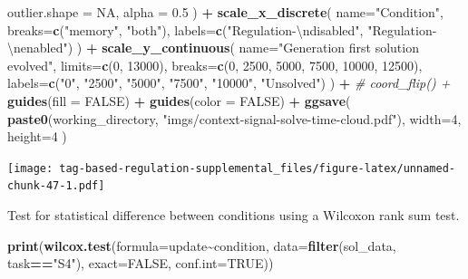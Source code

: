 \documentclass[
]{book}
\newenvironment{Shaded}{\begin{snugshade}}{\end{snugshade}}
\newcommand{\CharTok}[1]{\textcolor[rgb]{0.31,0.60,0.02}{#1}}
\newcommand{\CommentTok}[1]{\textcolor[rgb]{0.56,0.35,0.01}{\textit{#1}}}
\newcommand{\DataTypeTok}[1]{\textcolor[rgb]{0.13,0.29,0.53}{#1}}
\newcommand{\DecValTok}[1]{\textcolor[rgb]{0.00,0.00,0.81}{#1}}
\newcommand{\FloatTok}[1]{\textcolor[rgb]{0.00,0.00,0.81}{#1}}
\newcommand{\KeywordTok}[1]{\textcolor[rgb]{0.13,0.29,0.53}{\textbf{#1}}}
\newcommand{\NormalTok}[1]{#1}
\newcommand{\OperatorTok}[1]{\textcolor[rgb]{0.81,0.36,0.00}{\textbf{#1}}}
\newcommand{\OtherTok}[1]{\textcolor[rgb]{0.56,0.35,0.01}{#1}}
\newcommand{\StringTok}[1]{\textcolor[rgb]{0.31,0.60,0.02}{#1}}
\begin{document}
\begin{Shaded}
\begin{Highlighting}[]
    \DataTypeTok{outlier.shape =} \OtherTok{NA}\NormalTok{,}
    \DataTypeTok{alpha =} \FloatTok{0.5}
\NormalTok{  ) }\OperatorTok{+}
\StringTok{  }\KeywordTok{scale\_x\_discrete}\NormalTok{(}
    \DataTypeTok{name=}\StringTok{"Condition"}\NormalTok{,}
    \DataTypeTok{breaks=}\KeywordTok{c}\NormalTok{(}\StringTok{"memory"}\NormalTok{, }\StringTok{"both"}\NormalTok{),}
    \DataTypeTok{labels=}\KeywordTok{c}\NormalTok{(}\StringTok{"Regulation{-}}\CharTok{\textbackslash{}n}\StringTok{disabled"}\NormalTok{, }\StringTok{"Regulation{-}}\CharTok{\textbackslash{}n}\StringTok{enabled"}\NormalTok{)}
\NormalTok{  ) }\OperatorTok{+}
\StringTok{  }\KeywordTok{scale\_y\_continuous}\NormalTok{(}
    \DataTypeTok{name=}\StringTok{"Generation first solution evolved"}\NormalTok{,}
    \DataTypeTok{limits=}\KeywordTok{c}\NormalTok{(}\DecValTok{0}\NormalTok{, }\DecValTok{13000}\NormalTok{),}
    \DataTypeTok{breaks=}\KeywordTok{c}\NormalTok{(}\DecValTok{0}\NormalTok{, }\DecValTok{2500}\NormalTok{, }\DecValTok{5000}\NormalTok{, }\DecValTok{7500}\NormalTok{, }\DecValTok{10000}\NormalTok{, }\DecValTok{12500}\NormalTok{),}
    \DataTypeTok{labels=}\KeywordTok{c}\NormalTok{(}\StringTok{"0"}\NormalTok{, }\StringTok{"2500"}\NormalTok{, }\StringTok{"5000"}\NormalTok{, }\StringTok{"7500"}\NormalTok{, }\StringTok{"10000"}\NormalTok{, }\StringTok{"Unsolved"}\NormalTok{)}
\NormalTok{  ) }\OperatorTok{+}
\StringTok{  }\CommentTok{\# coord\_flip() +}
\StringTok{  }\KeywordTok{guides}\NormalTok{(}\DataTypeTok{fill =} \OtherTok{FALSE}\NormalTok{) }\OperatorTok{+}
\StringTok{  }\KeywordTok{guides}\NormalTok{(}\DataTypeTok{color =} \OtherTok{FALSE}\NormalTok{) }\OperatorTok{+}
\StringTok{  }\KeywordTok{ggsave}\NormalTok{(}
    \KeywordTok{paste0}\NormalTok{(working\_directory, }\StringTok{"imgs/context{-}signal{-}solve{-}time{-}cloud.pdf"}\NormalTok{),}
    \DataTypeTok{width=}\DecValTok{4}\NormalTok{,}
    \DataTypeTok{height=}\DecValTok{4}
\NormalTok{  )}
\end{Highlighting}
\end{Shaded}

\texttt{[image: tag-based-regulation-supplemental\_files/figure-latex/unnamed-chunk-47-1.pdf]}

Test for statistical difference between conditions using a Wilcoxon rank sum test.

\begin{Shaded}
\begin{Highlighting}[]
\KeywordTok{print}\NormalTok{(}\KeywordTok{wilcox.test}\NormalTok{(}\DataTypeTok{formula=}\NormalTok{update}\OperatorTok{\textasciitilde{}}\NormalTok{condition, }\DataTypeTok{data=}\KeywordTok{filter}\NormalTok{(sol\_data, task}\OperatorTok{==}\StringTok{"S4"}\NormalTok{), }\DataTypeTok{exact=}\OtherTok{FALSE}\NormalTok{, }\DataTypeTok{conf.int=}\OtherTok{TRUE}\NormalTok{))}
\end{Highlighting}
\end{Shaded}
\end{document}

